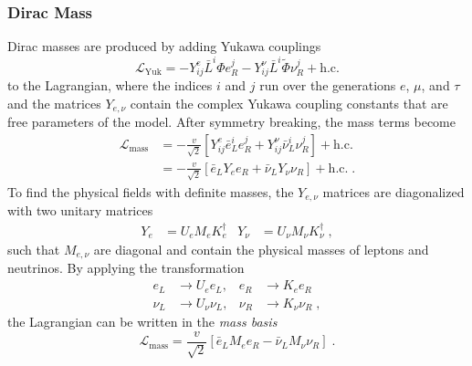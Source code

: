 \subsubsection{Dirac Mass}

Dirac masses are produced by adding Yukawa couplings
\begin{equation}
    \mathcal{L}_\mathrm{Yuk} = -Y_{ij}^e \bar{L}^i \Phi e_R^j - Y_{ij}^\nu \bar{L}^i \tilde{\Phi} \nu_R^j + \mathrm{h.c.}
\end{equation}
to the Lagrangian, where the indices $i$ and $j$ run over the generations $e$, $\mu$, and $\tau$ and the matrices $Y_{e,\nu}$ contain the complex Yukawa coupling constants that are free parameters of the model. After symmetry breaking, the mass terms become
\begin{equation}
\begin{aligned}
  \mathcal{L}_\mathrm{mass} &= -\frac{v}{\sqrt{2}}\left[  Y^e_{ij} \bar{e}_L^i e_R^j +  Y^\nu_{ij} \bar{\nu}_L^i \nu_R^j \right] + \mathrm{h.c.} \\
  &=  -\frac{v}{\sqrt{2}}\left[ \bar{e}_L Y_e e_R + \bar{\nu}_L Y_\nu \nu_R \right] + \mathrm{h.c.}\;.
\end{aligned}
\end{equation}
To find the physical fields with definite masses, the $Y_{e,\nu}$ matrices are diagonalized with two unitary matrices
\begin{align}
    Y_e &= U_e M_e K_e^\dag &Y_\nu &= U_\nu M_\nu K_\nu^\dag\;,
\end{align}
such that $M_{e,\nu}$ are diagonal and contain the physical masses of leptons and neutrinos. By applying the transformation
\begin{equation}
\begin{aligned}
    e_L &\rightarrow U_e e_L, &e_R &\rightarrow K_e e_R \\
    \nu_L &\rightarrow U_\nu \nu_L, &\nu_R &\rightarrow K_\nu \nu_R\;, \label{eq:mass-basis-trafo}
\end{aligned}
\end{equation}
the Lagrangian can be written in the \emph{mass basis}
\begin{equation}
    \mathcal{L}_\mathrm{mass} = \frac{v}{\sqrt{2}} \left[ \bar{e}_L M_e e_R - \bar{\nu}_L M_\nu \nu_R \right]\;.\label{eq:mass-lagrangian-diagonal}
\end{equation}

